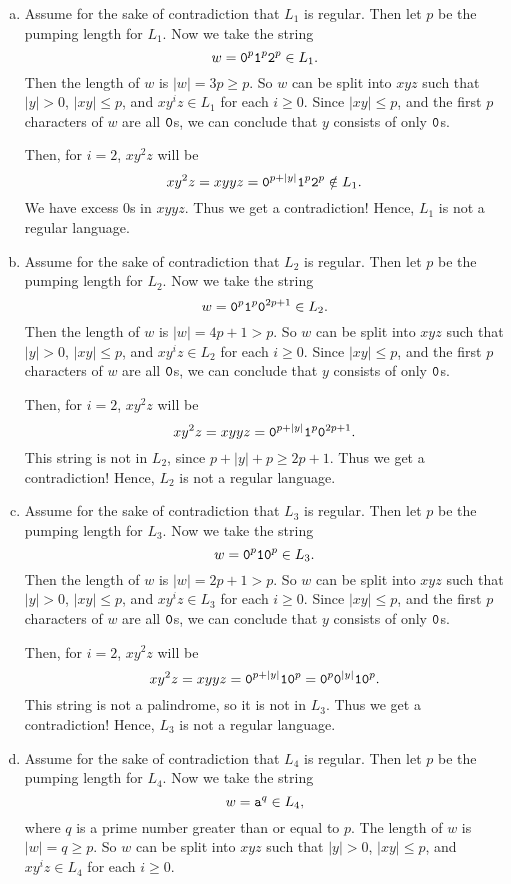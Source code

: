 \documentclass{article}
\begin{document}
\sectionline
\begin{enumerate}[(a)]
\item Assume for the sake of contradiction that \(L_1\) is regular. Then let \(p\) be the pumping length for \(L_1\). Now we take the string 
\[ w = \texttt{0}^p \texttt{1}^p \texttt{2}^p \in L_1. \]
Then the length of \(w\) is \(|w| = 3p \geq p\). So \(w\) can be split into \(xyz\) such that \(|y| > 0\), \(|xy| \leq p\), and \(xy^iz \in L_1\) for each \(i \geq 0\). Since \(|xy| \leq p\), and the first \(p\) characters of \(w\) are all \(\texttt{0}\)s, we can conclude that \(y\) consists of only \(\texttt{0}\)s.

Then, for \(i=2\), \(xy^2z\) will be 
\[ xy^2z = xyyz = \texttt{0}^{p + |y|} \texttt{1}^p \texttt{2}^p \notin L_1 .  \]
We have excess 0s in \(xyyz\). Thus we get a contradiction! Hence, \(L_1\) is not a regular language.

\item Assume for the sake of contradiction that \(L_2\) is regular. Then let \(p\) be the pumping length for \(L_2\). Now we take the string 
\[ w = \texttt{0}^p \texttt{1}^p \texttt{0}^{2p+1} \in L_2. \]
Then the length of \(w\) is \(|w| = 4p+1 > p\). So \(w\) can be split into \(xyz\) such that \(|y| > 0\), \(|xy| \leq p\), and \(xy^iz \in L_2\) for each \(i \geq 0\). Since \(|xy| \leq p\), and the first \(p\) characters of \(w\) are all \(\texttt{0}\)s, we can conclude that \(y\) consists of only \(\texttt{0}\)s.

Then, for \(i=2\), \(xy^2z\) will be 
\[ xy^2z = xyyz = \texttt{0}^{p + |y|} \texttt{1}^p \texttt{0}^{2p+1} .  \]
This string is not in \(L_2\), since \(p+|y|+p \ge 2p+1\). Thus we get a contradiction! Hence, \(L_2\) is not a regular language.
\item Assume for the sake of contradiction that \(L_3\) is regular. Then let \(p\) be the pumping length for \(L_3\). Now we take the string 
\[ w = \texttt{0}^p \texttt{1} \texttt{0}^{p} \in L_3. \]
Then the length of \(w\) is \(|w| = 2p+1 > p\). So \(w\) can be split into \(xyz\) such that \(|y| > 0\), \(|xy| \leq p\), and \(xy^iz \in L_3\) for each \(i \geq 0\). Since \(|xy| \leq p\), and the first \(p\) characters of \(w\) are all \(\texttt{0}\)s, we can conclude that \(y\) consists of only \(\texttt{0}\)s.

Then, for \(i=2\), \(xy^2z\) will be 
\[ xy^2z = xyyz = \texttt{0}^{p + |y|} \texttt{1} \texttt{0}^{p} = \texttt{0}^p \texttt{0}^{|y|} \texttt{1} \texttt{0}^p .  \]
This string is not a palindrome, so it is not in \(L_3\). Thus we get a contradiction! Hence, \(L_3\) is not a regular language.
\item Assume for the sake of contradiction that \(L_4\) is regular. Then let \(p\) be the pumping length for \(L_4\). Now we take the string 
\[  w = \texttt{a}^q \in L_4 , \]
where \(q\) is a prime number greater than or equal to \(p\). 
The length of \(w\) is \(|w| = q \geq p\). So \(w\) can be split into \(xyz\) such that \(|y| > 0\), \(|xy| \leq p\), and \(xy^iz \in L_4\) for each \(i \geq 0\). \ 


\end{enumerate}
\end{document}
